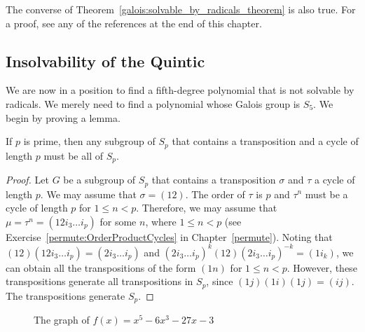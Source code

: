 \medskip


The converse of Theorem~\ref{galois:solvable_by_radicals_theorem} is also true.  For a proof, see any of the
references at the end of this chapter.
 
 
 	   
\subsection*{Insolvability of the Quintic}
 

We are now in a position to find a fifth-degree polynomial that is not
solvable by radicals.  We merely need to find a polynomial whose
Galois group is $S_5$. We begin by proving a lemma.


\begin{lemma}\label{galois:Sn_generating_lemma}
If $p$ is prime, then any subgroup of $S_p$ that contains a transposition and a cycle of length
$p$ must be all of $S_p$. 
\end{lemma}
 
 
\begin{proof}
Let $G$ be a subgroup of $S_p$ that contains a transposition $\sigma$
and $\tau$ a cycle of length $p$.  We may assume that $\sigma = (1 2)$.  The order of $\tau$ is $p$ and $\tau^n$ must be a cycle of length $p$ for $1 \leq n < p$.  Therefore, we may assume that $\mu = \tau^n = (1 2 i_3 \ldots i_p)$ for some $n$, where $1 \leq n < p$ (see Exercise~\ref{permute:OrderProductCycles} in Chapter~\ref{permute}).
Noting that $(1 2)(12 i_3\ldots i_p) = (2 i_3\ldots i_p)$
and $(2i_3 \ldots i_p)^k(12)(2i_3 \ldots i_p)^{-k} = (1i_k)$, we can obtain all
the transpositions of the form $(1n)$ for $1 \leq n < p$. However, these
transpositions generate all transpositions in $S_p$, since $(1j)(1 i)(1
j) = (i j)$.  The transpositions generate $S_p$. 
\end{proof}
 
 
\medskip
\begin{figure}
\begin{center}


\end{center}
\caption{The graph of $f(x) = x^5 - 6 x^3 - 27 x - 3$}
\label{Galois4}
\end{figure}

